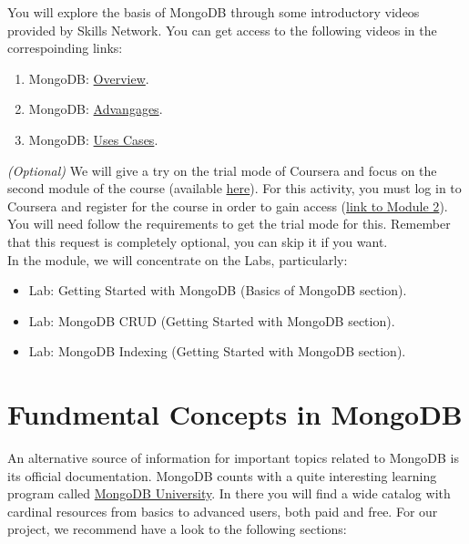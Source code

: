 \documentclass{article}
\begin{document}
You will explore the basis of MongoDB through some introductory videos provided by Skills Network.  You can get access to the following videos in the correspoinding links:

\begin{enumerate}
    \item MongoDB: \href{https://drive.google.com/file/d/1Zy8JrNUHdTJEN1fKGt_WsP9VemwUIoR3/view?usp=drive_link}{Overview}.
    \item MongoDB: \href{https://drive.google.com/file/d/1rxBzyJSaYguZakRydyjWxnxGp4oINfPv/view?usp=drive_link}{Advangages}.
    \item MongoDB: \href{https://drive.google.com/file/d/1mO9VbdRoD7DBIoq_m80_wwoAHwbT8Cn9/view?usp=drive_link}{Uses Cases}.
\end{enumerate}

\textit{(Optional)} We will give a try on the trial mode of Coursera and focus on the second module of the course (available \href{https://www.coursera.org/learn/introduction-to-nosql-databases}{here}). For this activity, you must log in to Coursera and register for the course in order to gain access (\href{https://www.coursera.org/learn/introduction-to-nosql-databases/home/module/2}{link to Module 2}).  You will need follow the requirements to get the trial mode for this.  Remember that this request is completely optional, you can skip it if you want.\\

In the module, we will concentrate on the Labs, particularly:

\begin{itemize}
    \item Lab: Getting Started with MongoDB (Basics of MongoDB section).
    \item Lab: MongoDB CRUD (Getting Started with MongoDB section).
    \item Lab: MongoDB Indexing (Getting Started with MongoDB section).
\end{itemize}

\section{Fundmental Concepts in MongoDB}
An alternative source of information for important topics related to MongoDB is its official documentation.  MongoDB counts with a quite interesting learning program called \href{https://learn.mongodb.com/}{MongoDB University}.  In there you will find a wide catalog with cardinal resources from basics to advanced users, both paid and free.  For our project, we recommend have a look to the following sections:
\end{document}
